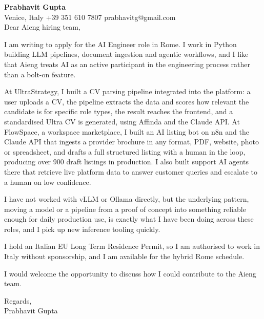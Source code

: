 \documentclass[a4paper,10.5pt]{article}
\begin{document}
\textbf{Prabhavit Gupta}\\
Venice, Italy \textbar{} +39 351 610 7807 \textbar{} prabhavitg@gmail.com\\[10pt]
Dear Aieng hiring team,

I am writing to apply for the AI Engineer role in Rome. I work in Python building LLM pipelines, document ingestion and agentic workflows, and I like that Aieng treats AI as an active participant in the engineering process rather than a bolt-on feature.

At UltraStrategy, I built a CV parsing pipeline integrated into the platform: a user uploads a CV, the pipeline extracts the data and scores how relevant the candidate is for specific role types, the result reaches the frontend, and a standardised Ultra CV is generated, using Affinda and the Claude API. At FlowSpace, a workspace marketplace, I built an AI listing bot on n8n and the Claude API that ingests a provider brochure in any format, PDF, website, photo or spreadsheet, and drafts a full structured listing with a human in the loop, producing over 900 draft listings in production. I also built support AI agents there that retrieve live platform data to answer customer queries and escalate to a human on low confidence.

I have not worked with vLLM or Ollama directly, but the underlying pattern, moving a model or a pipeline from a proof of concept into something reliable enough for daily production use, is exactly what I have been doing across these roles, and I pick up new inference tooling quickly.

I hold an Italian EU Long Term Residence Permit, so I am authorised to work in Italy without sponsorship, and I am available for the hybrid Rome schedule.

I would welcome the opportunity to discuss how I could contribute to the Aieng team.

Regards,\\
Prabhavit Gupta
\end{document}
